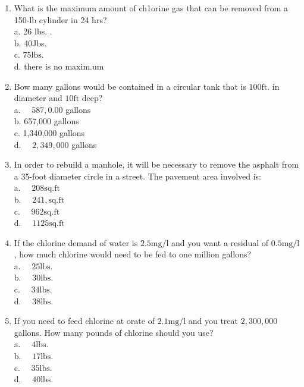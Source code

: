 \begin{enumerate}
\item What is the maximum amount of ch1orine gas that can be removed from a 150-lb cylinder in 24 hrs?\\
a. 26 lbs. .\\
b. 40Jbs.\\
c. $75 \mathrm{lbs}$.\\
d. there is no maxim.um\\

\item Bow many gallons would be contained in a circular tank that is $100 \mathrm{ft}$. in diameter and $10 \mathrm{ft}$ deep?\\
a. $\quad 587,0.00$ gallons\\
b. 657,000 gallons\\
c. 1,340,000 gallons\\
d. $\quad 2,349,000$ gallons\\


\item In order to rebuild a manhole, it will be necessary to remove the asphalt from a 35-foot diameter circle in a street. The pavement area involved is:\\
a. $\quad 208 \mathrm{sq. ft}$\\
b. $\quad 241, \mathrm{sq. ft}$\\
c. $\quad 962 \mathrm{sq. ft}$\\
d. $\quad 1125 \mathrm{sq. ft}$\\

\item If the chlorine demand of water is $2.5 \mathrm{mg} / \mathrm{l}$ and you want a residual of $0.5 \mathrm{mg} / \mathrm{l}$, how much chlorine would need to be fed to one million gallons?\\
a. $\quad 25 \mathrm{lbs}$.\\
b. $\quad 30 \mathrm{lbs}$.\\
c. $\quad 34 \mathrm{lbs}$.\\
d. $\quad 38 \mathrm{lbs}$.\\

\item If you need to feed chlorine at orate of $2.1 \mathrm{mg} / \mathrm{l}$ and you treat $2,300,000$ gallons. How many pounds of chlorine should you use?\\
a. $\quad 4 \mathrm{lbs}$.\\
b. $\quad 17 \mathrm{lbs}$.\\
c. $\quad 35 \mathrm{lbs}$.\\
d. $\quad 40 \mathrm{lbs}$.\\


\end{enumerate}
